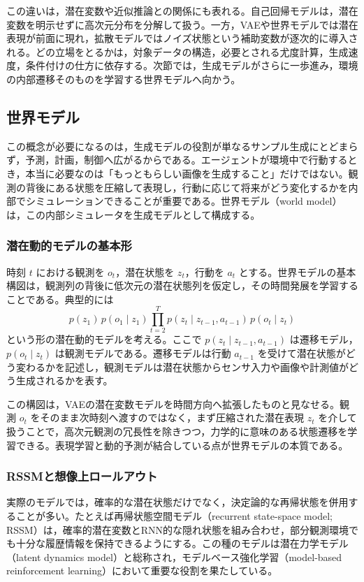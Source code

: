 この違いは，潜在変数や近似推論との関係にも表れる。自己回帰モデルは，潜在変数を明示せずに高次元分布を分解して扱う。一方，VAEや世界モデルでは潜在表現が前面に現れ，拡散モデルではノイズ状態という補助変数が逐次的に導入される。どの立場をとるかは，対象データの構造，必要とされる尤度計算，生成速度，条件付けの仕方に依存する。次節では，生成モデルがさらに一歩進み，環境の内部遷移そのものを学習する世界モデルへ向かう。

\subsection{世界モデル}

この概念が必要になるのは，生成モデルの役割が単なるサンプル生成にとどまらず，予測，計画，制御へ広がるからである。エージェントが環境中で行動するとき，本当に必要なのは「もっともらしい画像を生成すること」だけではない。観測の背後にある状態を圧縮して表現し，行動に応じて将来がどう変化するかを内部でシミュレーションできることが重要である。世界モデル（world model）は，この内部シミュレータを生成モデルとして構成する。

\subsubsection{潜在動的モデルの基本形}

時刻 \(t\) における観測を \(o_t\)，潜在状態を \(z_t\)，行動を \(a_t\) とする。世界モデルの基本構図は，観測列の背後に低次元の潜在状態列を仮定し，その時間発展を学習することである。典型的には
\[
p(z_1)\,p(o_1 \mid z_1)\prod_{t=2}^{T} p(z_t \mid z_{t-1},a_{t-1})\,p(o_t \mid z_t)
\]
という形の潜在動的モデルを考える。ここで \(p(z_t \mid z_{t-1},a_{t-1})\) は遷移モデル，\(p(o_t \mid z_t)\) は観測モデルである。遷移モデルは行動 \(a_{t-1}\) を受けて潜在状態がどう変わるかを記述し，観測モデルは潜在状態からセンサ入力や画像や計測値がどう生成されるかを表す。

この構図は，VAEの潜在変数モデルを時間方向へ拡張したものと見なせる。観測 \(o_t\) をそのまま次時刻へ渡すのではなく，まず圧縮された潜在表現 \(z_t\) を介して扱うことで，高次元観測の冗長性を除きつつ，力学的に意味のある状態遷移を学習できる。表現学習と動的予測が結合している点が世界モデルの本質である。

\subsubsection{RSSMと想像上ロールアウト}

実際のモデルでは，確率的な潜在状態だけでなく，決定論的な再帰状態を併用することが多い。たとえば再帰状態空間モデル（recurrent state-space model; RSSM）は，確率的潜在変数とRNN的な隠れ状態を組み合わせ，部分観測環境でも十分な履歴情報を保持できるようにする。この種のモデルは潜在力学モデル（latent dynamics model）と総称され，モデルベース強化学習（model-based reinforcement learning）において重要な役割を果たしている。

